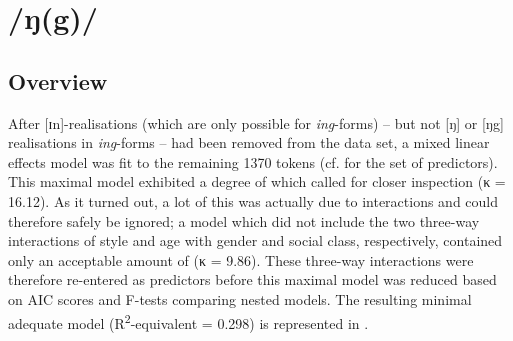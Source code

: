 \section{/ŋ(g)/}
\label{prod.res.con.ng}

\subsection{Overview}
\label{sec.prod.res.con.ng.overview}

After [ɪn]-realisations (which are only possible for \emph{ing}-forms) – but not [ŋ] or [ŋg] realisations in \emph{ing}-forms – had been removed from the data set, a mixed linear effects model was fit to the remaining 1370 tokens (cf.  for the set of predictors).
This maximal model exhibited a degree of  which called for closer inspection (κ = 16.12).
As it turned out, a lot of this  was actually due to interactions and could therefore safely be ignored; a model which did not include the two three-way interactions of style and age with gender and social class, respectively, contained only an acceptable amount of  (κ = 9.86).
These three-way interactions were therefore re-entered as predictors before this maximal model was reduced based on AIC scores and F-tests comparing nested models.
The resulting minimal adequate model (R\textsuperscript{2}-equivalent = 0.298) is represented in .

